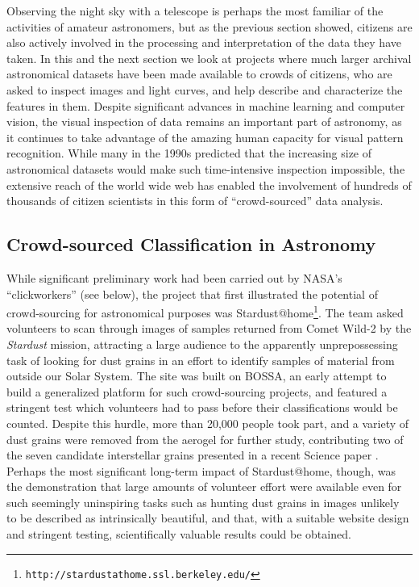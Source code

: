 \documentclass{ar2e}
\def\CaseStudy#1{\noindent{\it\bf #1 \,\,\,\,}}
\def\url#1{\texttt{#1}}
\begin{document}
Observing the night sky with a telescope is perhaps the most familiar of the
activities of amateur astronomers, but as the previous section showed, citizens
are also actively involved in the processing and interpretation of the data they
have taken.  In this and the next section we look at projects where much larger
archival astronomical datasets have been made available to crowds of citizens,
who are asked to inspect images and light curves, and help describe and
characterize the features in them. Despite significant advances in machine
learning and computer vision, the visual inspection of data remains an important
part of astronomy, as it continues to take advantage of the amazing human
capacity for visual pattern recognition. While many in the 1990s predicted that
the increasing size of astronomical datasets would make such time-intensive
inspection impossible, the extensive reach of the world wide web has enabled the
involvement of hundreds of thousands of citizen scientists in this form of
``crowd-sourced'' data analysis. 


\subsection{Crowd-sourced Classification in Astronomy}
\label{sec:class:astro}

\CaseStudy{Stardust@home}
While significant preliminary work had been carried out by NASA's
``clickworkers'' (see below), the project that first illustrated the potential
of crowd-sourcing for astronomical purposes was 
Stardust@home\footnote{\url{http://stardustathome.ssl.berkeley.edu/}}. The team
asked volunteers to scan through images of samples returned from Comet Wild-2 by
the \emph{Stardust} mission, attracting a large audience to the apparently
unprepossessing task of looking for dust grains in an effort to identify samples
of material from outside our Solar System. The site was built on BOSSA, an early
attempt to build a generalized platform for such crowd-sourcing projects, and
featured a stringent test which volunteers had to pass before their
classifications would be counted. Despite this hurdle, more than 20,000 people
took part, and a variety of dust grains were removed from the aerogel for
further study, contributing two of the seven candidate interstellar grains presented in a recent Science paper \citep{Westphal}. Perhaps the most significant long-term impact of
Stardust@home, though, was the demonstration that large amounts of volunteer
effort were available even for such seemingly uninspiring tasks such as hunting
dust grains in images unlikely to be described as intrinsically beautiful, and
that, with a suitable website design and stringent testing, scientifically
valuable results could be obtained. 
\end{document}
